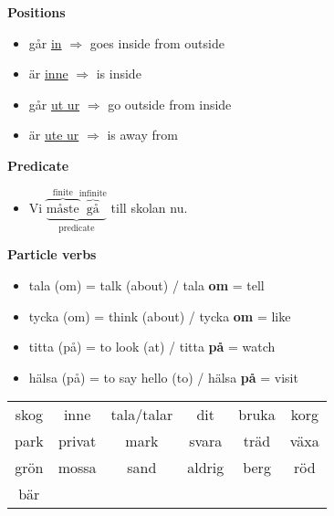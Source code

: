 
\begin{flushleft}
    \textbf{Positions}
    \begin{itemize}
        \item går \underline{in} $\Rightarrow$ goes inside from outside
        \item är \underline{inne} $\Rightarrow$ is inside
        \item går \underline{\underline{ut} ur} $\Rightarrow$ go outside from inside
        \item är \underline{\underline{ute} ur} $\Rightarrow$ is away from
    \end{itemize}

    \textbf{Predicate}
    \begin{itemize}
        \item Vi
        $\underbrace{
            \overbrace{\text{måste}}^{\text{finite}} 
            \overbrace{\text{gå}}^{\text{infinite}}
        }_{\text{predicate}}$
        till skolan nu.
    \end{itemize}

    \textbf{Particle verbs}
    \begin{itemize}
        \item tala (om) = talk (about) / tala \textbf{om} = tell
        \item tycka (om) = think (about) / tycka \textbf{om} = like
        \item titta (på) = to look (at) / titta \textbf{på} = watch
        \item hälsa (på) = to say hello (to) / hälsa \textbf{på} = visit
    \end{itemize}
\end{flushleft}

\begin{center}
    \begin{tabular}{|c c c c c c|}
        \hline
        skog & inne & tala/talar & dit & bruka & korg \\
        park & privat & mark & svara & träd & växa \\
        grön & mossa & sand & aldrig & berg & röd \\
        bär &&&&& \\
        \hline
    \end{tabular}
\end{center}

